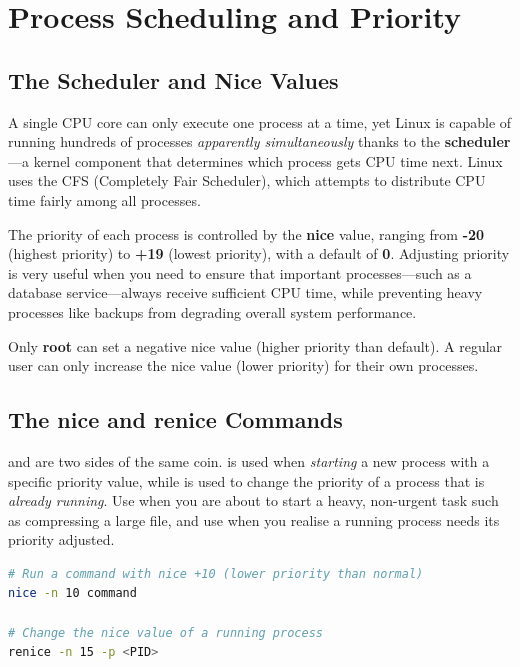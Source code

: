 \section{Process Scheduling and Priority}
\label{sec:process-scheduling}

\subsection{The Scheduler and Nice Values}

A single CPU core can only execute one process at a time, yet Linux is capable
of running hundreds of processes \textit{apparently simultaneously} thanks to
the \textbf{scheduler}---a kernel component that determines which process gets
CPU time next. Linux uses the CFS (Completely Fair Scheduler), which attempts
to distribute CPU time fairly among all processes.

The priority of each process is controlled by the \textbf{nice} value, ranging
from \textbf{-20} (highest priority) to \textbf{+19} (lowest priority), with a
default of \textbf{0}. Adjusting priority is very useful when you need to ensure
that important processes---such as a database service---always receive sufficient
CPU time, while preventing heavy processes like backups from degrading overall
system performance.

\begin{notebox}
  Only \textbf{root} can set a negative nice value (higher priority than
  default). A regular user can only increase the nice value (lower priority)
  for their own processes.
\end{notebox}

\subsection{The nice and renice Commands}

 and  are two sides of the same coin.  is used
when \textit{starting} a new process with a specific priority value, while
 is used to change the priority of a process that is \textit{already
running}. Use  when you are about to start a heavy, non-urgent task
such as compressing a large file, and use  when you realise a
running process needs its priority adjusted.

\begin{lstlisting}[language=bash, caption={Syntax of nice and renice}]
# Run a command with nice +10 (lower priority than normal)
nice -n 10 command

# Change the nice value of a running process
renice -n 15 -p <PID>
\end{lstlisting}

